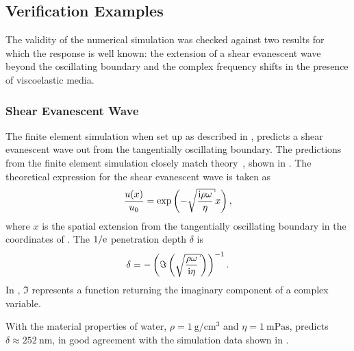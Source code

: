 \subsection{Verification Examples}
The validity of the numerical simulation was checked against two results
for which the response is well known: the extension of a shear evanescent
wave beyond the oscillating boundary and the complex frequency shifts in
the presence of viscoelastic media.

\subsubsection{Shear Evanescent Wave}
The finite element simulation when set up as described in
, predicts a shear evanescent wave out from
the tangentially oscillating boundary.  The predictions from the finite
element simulation closely match theory~\cite{steinem2007piezoelectric},
shown in .  The theoretical expression for the
shear evanescent wave is taken as~\cite{steinem2007piezoelectric}
\begin{equation}
 \frac{u(x)}{u_0} = \exp\left(-\sqrt{\frac{\mi \rho \omega}{\eta}} x\right),
\end{equation}
where $x$ is the spatial extension from the tangentially oscillating
boundary in the coordinates of .  The $1/{\mathrm{e}}$
penetration depth $\delta$ is
\begin{equation}
 \delta =
 -\left(\Im\left(\sqrt{\frac{\rho\omega}{\mi\eta}}\right)\right)^{-1}.
\label{eqn:suppshearwavedelta}
\end{equation}
In , $\Im$ represents a function returning
the imaginary component of a complex variable.

With the material properties of water,
$\rho=\SI{1}{\gram\per\centi\meter\cubed}$ and
$\eta=\SI{1}{\milli\pascal\second}$, 
predicts $\delta\approx\SI{252}{\nano\meter}$, in good agreement with the
simulation data shown in .

